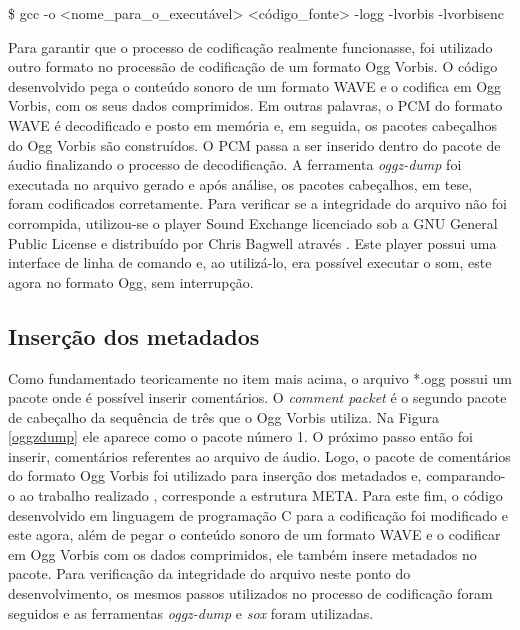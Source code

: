    
   \$ gcc -o <nome\_para\_o\_executável> <código\_fonte> -logg -lvorbis -lvorbisenc


Para garantir que o processo de codificação realmente funcionasse, foi utilizado outro formato no processão de codificação de um formato Ogg Vorbis. O código desenvolvido pega o conteúdo sonoro de um formato WAVE e o codifica em Ogg Vorbis, com os seus dados comprimidos. Em outras palavras, o PCM do formato WAVE é decodificado e posto em memória e, em seguida, os pacotes cabeçalhos do Ogg Vorbis são construídos. O PCM passa a ser inserido dentro do pacote de áudio finalizando o processo de decodificação. A ferramenta \textit{oggz-dump} foi executada no arquivo gerado e após análise, os pacotes cabeçalhos, em tese, foram codificados corretamente. Para verificar se a integridade do arquivo não foi corrompida, utilizou-se o player Sound Exchange licenciado sob a GNU General Public License e distribuído por Chris Bagwell através \cite{sox}. Este player possui uma interface de linha de comando e, ao utilizá-lo, era possível executar o som, este agora no formato Ogg, sem interrupção. 




\subsection{Inserção dos metadados}

Como fundamentado teoricamente no item mais acima, o arquivo *.ogg possui um pacote onde é possível inserir comentários. O \textit{comment packet} é o segundo pacote de cabeçalho da sequência de três que o Ogg Vorbis utiliza. Na Figura \ref{oggzdump} ele aparece como o pacote número 1. O próximo passo então foi inserir, comentários referentes ao arquivo de áudio. Logo, o pacote de comentários do formato Ogg Vorbis foi utilizado para inserção dos metadados e, comparando-o ao trabalho realizado \cite{herbert}, corresponde a estrutura META. Para este fim, o código desenvolvido em linguagem de programação C para a codificação foi modificado e este agora, além de pegar o conteúdo sonoro de um formato WAVE e o codificar em Ogg Vorbis com os dados comprimidos, ele também insere metadados no pacote. Para verificação da integridade do arquivo neste ponto do desenvolvimento, os mesmos passos utilizados no processo de codificação foram seguidos e as ferramentas \textit{oggz-dump} e \textit{sox} foram utilizadas.

